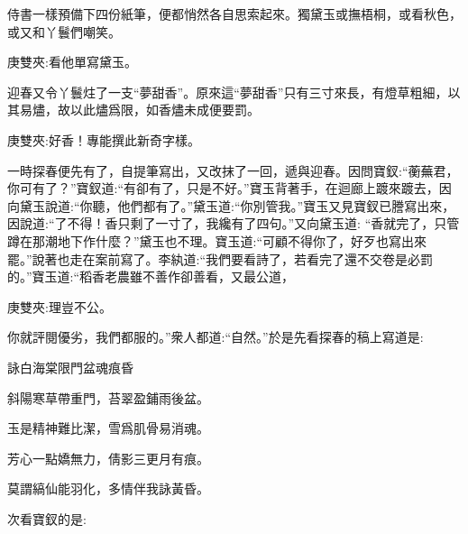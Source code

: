 \begin{parag}
    侍書一樣預備下四份紙筆，便都悄然各自思索起來。獨黛玉或撫梧桐，或看秋色，或又和丫鬟們嘲笑。\begin{note}庚雙夾:看他單寫黛玉。\end{note}迎春又令丫鬟炷了一支“夢甜香”。原來這“夢甜香”只有三寸來長，有燈草粗細，以其易燼，故以此燼爲限，如香燼未成便要罰。\begin{note}庚雙夾:好香！專能撰此新奇字樣。\end{note}一時探春便先有了，自提筆寫出，又改抹了一回，遞與迎春。因問寶釵:“蘅蕪君，你可有了？”寶釵道:“有卻有了，只是不好。”寶玉背著手，在迴廊上踱來踱去，因向黛玉說道:“你聽，他們都有了。”黛玉道:“你別管我。”寶玉又見寶釵已謄寫出來，因說道:“了不得！香只剩了一寸了，我纔有了四句。”又向黛玉道: “香就完了，只管蹲在那潮地下作什麼？”黛玉也不理。寶玉道:“可顧不得你了，好歹也寫出來罷。”說著也走在案前寫了。李紈道:“我們要看詩了，若看完了還不交卷是必罰的。”寶玉道:“稻香老農雖不善作卻善看，又最公道，\begin{note}庚雙夾:理豈不公。\end{note}你就評閱優劣，我們都服的。”衆人都道:“自然。”於是先看探春的稿上寫道是:
\end{parag}


\begin{poem}
    \begin{pl}詠白海棠限門盆魂痕昏\end{pl}

    \begin{pl}斜陽寒草帶重門，苔翠盈鋪雨後盆。\end{pl}

    \begin{pl}玉是精神難比潔，雪爲肌骨易消魂。\end{pl}

    \begin{pl}芳心一點嬌無力，倩影三更月有痕。\end{pl}

    \begin{pl}莫謂縞仙能羽化，多情伴我詠黃昏。\end{pl}
\end{poem}


\begin{parag}
    次看寶釵的是:
\end{parag}


